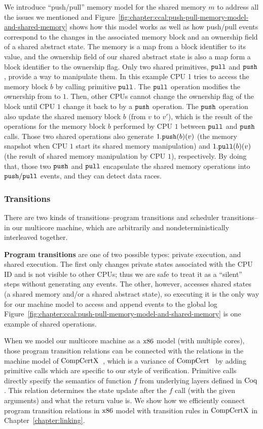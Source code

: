 We introduce ``push/pull'' memory model for the shared memory $m$ to address all the issues we mentioned and 
Figure~\ref{fig:chapter:ccal:push-pull-memory-model-and-shared-memory} shows 
how this model works as well as how push/pull events correspond to the changes in the associated memory block and an ownership field of a shared abstract state.
The memory is a map from a block identifier to its value,
and the ownership field of our shared abstract state is also a map form a block identifier to the ownership flag.
Only two shared primitives, ${\mathrm{\texttt{pull}}}$ and ${\mathrm{\texttt{push}}}$,
provide a way to manipulate them.
In this example CPU 1 tries to access the memory block $b$ by calling primitive ${\mathrm{\texttt{pull}}}$. 
The ${\mathrm{\texttt{pull}}}$ operation modifies the ownership from  to  $1$. 
Then, other CPUs cannot change the ownership flag of the block until CPU $1$ change it back to  
by a ${\mathrm{\texttt{push}}}$ operation.
The ${\mathrm{\texttt{push}}}$ operation also update the shared memory block $b$ (from $v$ to $v'$), which is the result of the operations for the memory block $b$ performed by CPU $1$  between ${\mathrm{\texttt{pull}}}$ and ${\mathrm{\texttt{push}}}$ calls. 
Those two shared operations also generate $1.{\mathrm{\texttt{push}}}(b)(v)$ (the memory snapshot when CPU $1$ start its shared memory manipulation) 
and  $1.{\mathrm{\texttt{pull}}}(b)(v)$ (the result of shared memory manipulation by CPU $1$), respectively.
By doing that, those two ${\mathrm{\texttt{push}}}$ and ${\mathrm{\texttt{pull}}}$ encapsulate the shared memory operations
into ${\mathrm{\texttt{push}}}/{\mathrm{\texttt{pull}}}$ events, and they can detect data races.

\subsubsection{Transitions}

There are two kinds of transitions--program transitions and scheduler transitions--in our multicore machine,
which are arbitrarily and nondeterministically interleaved together.


\textbf{Program transitions} are one of two possible types:
private execution, and shared execution.
The first only changes private states associated with the CPU ID and is not visible to other CPUs;
thus we are safe to treat it as a ``silent'' steps without generating any events. 
The other, however, 
accesses shared states (a shared memory and/or a shared abstract state),
so executing it is  the only way for our machine model  to access and append events to the global log 
Figure~\ref{fig:chapter:ccal:push-pull-memory-model-and-shared-memory} is one example of shared operations.

When we model our multicore machine as a $\mathrm{x86}$ model (with multiple cores),
those program transition relations can be connected with the relations 
in the machine model of $\mathrm{CompCertX}$~\cite{deepspec},
which is a variance of $\mathrm{CompCert}$~\cite{leroy09}
by adding primitive calls which are specific to our style of verification.
Primitive calls directly specify the semantics of function $f$ from underlying layers defined in $\mathrm{Coq}$. 
This relation determines the state update after the $f$ call (with the given arguments) and what the return value is.
We show how we efficiently connect program transition relations in 
$\mathrm{x86}$ model with transition rules in $\mathrm{CompCertX}$ in Chapter~\ref{chapter:linking}.

